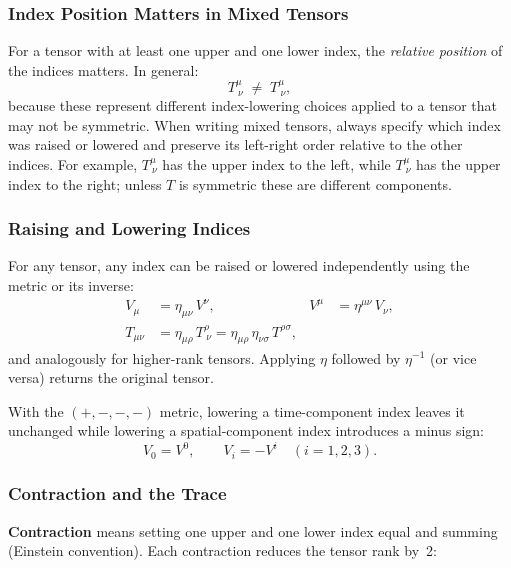 \subsubsection*{Index Position Matters in Mixed Tensors}

For a tensor with at least one upper and one lower index, the \emph{relative
position} of the indices matters.  In general:
\begin{equation}\label{eq:lec06:index-position}
    T^\mu_{\ \nu} \;\neq\; T_{\ \nu}^\mu ,
\end{equation}
because these represent different index-lowering choices applied to a tensor
that may not be symmetric.  When writing mixed tensors, always specify which
index was raised or lowered and preserve its left-right order relative to the
other indices.  For example, $T^\mu_{\ \nu}$ has the upper index to the left,
while $T_{\ \nu}^\mu$ has the upper index to the right; unless $T$ is
symmetric these are different components.

\subsubsection*{Raising and Lowering Indices}

For any tensor, any index can be raised or lowered independently using the
metric or its inverse:
\begin{align}
    V_\mu &= \eta_{\mu\nu}\,V^\nu, &
    V^\mu &= \eta^{\mu\nu}\,V_\nu, \label{eq:lec06:raise-lower-vector} \\[4pt]
    T_{\mu\nu} &= \eta_{\mu\rho}\,T^\rho_{\ \nu}
               = \eta_{\mu\rho}\,\eta_{\nu\sigma}\,T^{\rho\sigma},
    \label{eq:lec06:lower-rank2}
\end{align}
and analogously for higher-rank tensors.  Applying $\eta$ followed by
$\eta^{-1}$ (or vice versa) returns the original tensor.

With the $(+,-,-,-)$ metric, lowering a time-component index leaves it
unchanged while lowering a spatial-component index introduces a minus sign:
\begin{equation}\label{eq:lec06:lowering-sign}
    V_0 = V^0, \qquad V_i = -V^i \quad (i = 1,2,3).
\end{equation}

\subsubsection*{Contraction and the Trace}

\textbf{Contraction} means setting one upper and one lower index equal and
summing (Einstein convention).  Each contraction reduces the tensor rank
by~2:

